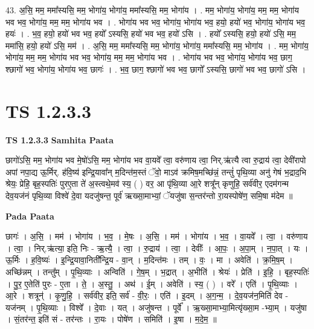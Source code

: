 \documentclass[17pt]{extarticle}
\begin{document}
43. अ॒सि॒ मम॒ ममा᳚स्यसि॒ मम॒ भोगा॑य॒ भोगा॑य॒ ममा᳚स्यसि॒ मम॒ भोगा॑य । . मम॒ भोगा॑य॒ भोगा॑य॒ मम॒ मम॒ भोगा॑य भव भव॒ भोगा॑य॒ मम॒ मम॒ भोगा॑य भव । . भोगा॑य भव भव॒ भोगा॑य॒ भोगा॑य भव॒ हयो॒ हयो॑ भव॒ भोगा॑य॒ भोगा॑य भव॒ हयः॑ । . भ॒व॒ हयो॒ हयो॑ भव भव॒ हयो᳚ ऽस्यसि॒ हयो॑ भव भव॒ हयो॑ ऽसि । . हयो᳚ ऽस्यसि॒ हयो॒ हयो॑ ऽसि॒ मम॒ ममा॑सि॒ हयो॒ हयो॑ ऽसि॒ मम॑ । . अ॒सि॒ मम॒ ममा᳚स्यसि॒ मम॒ भोगा॑य॒ भोगा॑य॒ ममा᳚स्यसि॒ मम॒ भोगा॑य । . मम॒ भोगा॑य॒ भोगा॑य॒ मम॒ मम॒ भोगा॑य भव भव॒ भोगा॑य॒ मम॒ मम॒ भोगा॑य भव । . भोगा॑य भव भव॒ भोगा॑य॒ भोगा॑य भव॒ छाग॒ श्छागो॑ भव॒ भोगा॑य॒ भोगा॑य भव॒ छागः॑ । . भ॒व॒ छाग॒ श्छागो॑ भव भव॒ छागो᳚ ऽस्यसि॒ छागो॑ भव भव॒ छागो॑ ऽसि । \newline
\pagebreak
{}
\section*{ TS 1.2.3.3 }

\textbf{TS 1.2.3.3 } \newline
\textbf{Samhita Paata} \newline

छागो॑ऽसि॒ मम॒ भोगा॑य भव मे॒षो॑ऽसि॒ मम॒ भोगा॑य भव वा॒यवे᳚ त्वा॒ वरु॑णाय त्वा॒ निर्.ऋ॑त्यै त्वा रु॒द्राय॑ त्वा॒ देवी॑रापो अपां नपा॒द्य ऊ॒र्मिर्. ह॑वि॒ष्य॑ इन्द्रि॒यावा᳚न् म॒दिन्त॑म॒स्तं ॅवो॒ माऽव॑ क्रमिष॒मच्छि॑न्नं॒ तन्तुं॑ पृथि॒व्या अनु॑ गेषं भ॒द्राद॒भि श्रेयः॒ प्रेहि॒ बृह॒स्पतिः॑ पुरए॒ता ते॑ अ॒स्त्वथे॒मव॑ स्य॒ ( ) वर॒ आ पृ॑थि॒व्या आ॒रे शत्रू᳚न् कृणुहि॒ सर्व॑वीर॒ एदम॑गन्म देव॒यज॑नं पृथि॒व्या विश्वे॑ दे॒वा यदजु॑षन्त॒ पूर्व॑ ऋख्सा॒माभ्यां॒ ॅयजु॑षा स॒न्तर॑न्तो रा॒यस्पोषे॑ण॒ समि॒षा म॑देम ॥ \newline

\textbf{Pada Paata} \newline

छागः॑ । अ॒सि॒ । मम॑ । भोगा॑य । भ॒व॒ । मे॒षः । अ॒सि॒ । मम॑ । भोगा॑य । भ॒व॒ । वा॒यवे᳚ । त्वा॒ । वरु॑णाय । त्वा॒ । निर्.ऋ॑त्या॒ इति॒ निः - ऋ॒त्यै॒ । त्वा॒ । रु॒द्राय॑ । त्वा॒ । देवीः᳚ । आ॒पः॒ । अ॒पा॒म् । न॒पा॒त् । यः । ऊ॒र्मिः । ह॒वि॒ष्यः॑ । इ॒न्द्रि॒यावा॒निती᳚न्द्रि॒य - वा॒न् । म॒दिन्त॑मः । तम् । वः॒ । मा । अवेति॑ । क्र॒मि॒ष॒म् । अच्छि॑न्नम् । तन्तु᳚म् । पृ॒थि॒व्याः । अन्विति॑ । गे॒ष॒म् । भ॒द्रात् । अ॒भीति॑ । श्रेयः॑ । प्रेति॑ । इ॒हि॒ । बृह॒स्पतिः॑ । पु॒र॒ ए॒तेति॑ पुरः - ए॒ता । ते॒ । अ॒स्तु॒ । अथ॑ । ई॒म् । अवेति॑ । स्य॒ ( ) । वरे᳚ । एति॑ । पृ॒थि॒व्याः । आ॒रे । शत्रून्॑ । कृ॒णु॒हि॒ । सर्व॑वीर॒ इति॒ सर्व॑ - वी॒रः॒ । एति॑ । इ॒दम् । अ॒ग॒न्म॒ । दे॒व॒यज॑न॒मिति॑ देव - यज॑नम् । पृ॒थि॒व्याः । विश्वे᳚ । दे॒वाः । यत् । अजु॑षन्त । पूर्वे᳚ । ऋ॒ख्सा॒माभ्या॒मित्यृ॑ख्सा॒म -भ्या॒म् । यजु॑षा । सं॒तर॑न्त॒ इति॑ सं - तर॑न्तः । रा॒यः । पोषे॑ण । समिति॑ । इ॒षा । म॒दे॒म॒ ॥  \newline
\end{document}
